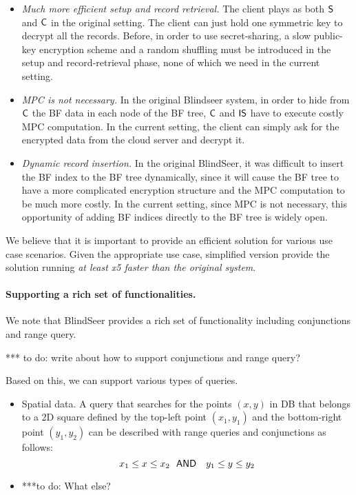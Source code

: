 \begin{itemize}
\item {\em Much more efficient setup and record retrieval.}
The client plays as both $\sf S$ and $\sf C$ in the original setting. The
client can just hold one symmetric key to decrypt all the records. Before, in
order to use secret-sharing, a slow public-key encryption scheme and a random
shuffling must be introduced in the setup and record-retrieval phase, none of
which we need in the current setting. 

\item {\em MPC is not necessary.} In the original Blindseer system, in order to
hide from $\sf C$ the BF data in each node of the BF tree, $\sf C$ and $\sf IS$
have to execute costly MPC computation. In the current setting, the client can
simply ask for the encrypted data from the cloud server and decrypt it. 

\item {\em Dynamic record insertion.} In the original BlindSeer, it was
difficult to insert the BF index to the BF tree dynamically, since it will
cause the BF tree to have a more complicated encryption structure and the MPC
computation to be much more costly. In the current setting, since MPC is not necessary, this opportunity of adding BF indices directly to the BF tree is widely open. 
\end{itemize}

We believe that it is important to provide an efficient solution for various
use case scenarios. Given the appropriate use case, simplified version provide
the solution running {\em at least x5 faster than the original system}.  

\paragraph{Supporting a rich set of functionalities.}
We note that BlindSeer provides a rich set of functionality including
conjunctions and range query. 

*** to do: write about how to support conjunctions and range query?

Based on this, we can support various types of queries. 
\begin{itemize}
\item Spatial data. A query that searches for the points $(x, y)$ in DB that
belongs to a 2D square defined by the top-left point $(x_1, y_1)$ and the
bottom-right point $(y_1, y_2)$ can be described with range queries and conjunctions as follows:
  $$ x_1 \le x \le x_2 ~~{\sf AND}~~~ y_1 \le y \le y_2 $$

\item ***to do: What else? 
\end{itemize}

